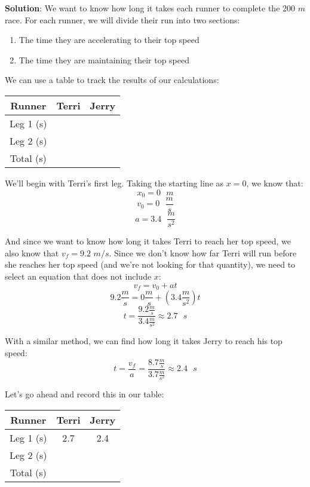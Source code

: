 \textbf{Solution}: We want to know how long it takes each runner to complete the 
200 $m$ race. For each runner, we will divide their run into two sections:
\begin{enumerate}
\item The time they are accelerating to their top speed
\item The time they are maintaining their top speed
\end{enumerate}

We can use a table to track the results of our calculations:
\begin{center}
\begin{tabular}{|c|c|c|}
\hline
Runner & Terri & Jerry\\\hline
Leg 1 (s) & & \\\hline
Leg 2 (s) & & \\\hline
Total (s) & & \\\hline
\end{tabular}
\end{center}

We'll begin with Terri's first leg. Taking the starting line as $x = 0$, we know 
that:
$$x_0 = 0\text{ }m$$
$$v_0 = 0\text { } \frac{m}{s}$$
$$a = 3.4\text{ }\frac{m}{s^2}$$

And since we want to know how long it takes Terri to reach her top speed, we 
also know that $v_f = 9.2$ $m/s$. Since we don't know how far Terri will run 
before she reaches her top speed (and we're not looking for that quantity), we 
need to select an equation that does not include $x$:
$$v_f = v_0 + at$$
$$9.2 \frac{m}{s} = 0 \frac{m}{s} + \left(3.4 \frac{m}{s^2} \right)t$$
$$t = \frac{9.2 \frac{m}{s}}{3.4 \frac{m}{s^2}} \approx 2.7\text{ }s$$

With a similar method, we can find how long it takes Jerry to reach his top 
speed:
$$t = \frac{v_f}{a} = \frac{8.7 \frac{m}{s}}{3.7 \frac{m}{s^2}} \approx 2.4
\text{ }s$$

Let's go ahead and record this in our table:
\begin{center}
\begin{tabular}{|c|c|c|}
\hline
Runner & Terri & Jerry\\\hline
Leg 1 (s) & 2.7 & 2.4 \\\hline
Leg 2 (s) & & \\\hline
Total (s) & & \\\hline
\end{tabular}
\end{center}

